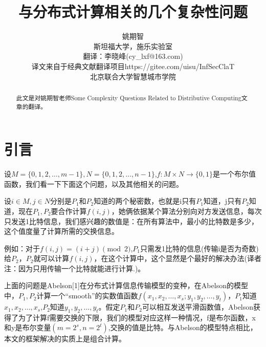 \documentclass[]{article}
\title{与分布式计算相关的几个复杂性问题}
\author{姚期智\\
	斯坦福大学，施乐实验室\\
{\small  翻译：李晓峰(cy\_lxf@163.com)}\\
{\small  译文来自于经典文献翻译项目https://gitee.com/uisu/InfSecClaT}\\
{\small 北京联合大学智慧城市学院}
}
\begin{document}
	
	\maketitle
	
	\begin{abstract}
		此文是对姚期智老师Some Complexity Questions Related to Distributive Computing文章的翻译。
	\end{abstract}
	
	\section{引言}
	设$M=\{0,1,2,\ldots,m-1\},N=\{0,1,2,\dots,n-1\}$,$f:M\times N \rightarrow \{0,1\}$是一个布尔值函数，我们看一下下面这个问题，以及其他相关的问题。\par
	设$i\in M,j\in N$分别是$P_1$和$P_2$知道的两个秘密数，也就是i只有$P_1$知道，j只有$P_2$知道，现在$P_1,P_2$要合作计算$f(i,j)$，她俩依据某个算法分别向对方发送信息，每次只发送1比特信息，我们感兴趣的数值是：在所有算法中，最小的比特数是多少，这个值度量了计算所需的交换信息。\par
	例如：对于$f(i,j)=(i+j)\pmod{2}$,$P_1$只需发1比特的信息(传输i是否为奇数)给$P_2$，$P_2$就可以计算$f(i,j)$，在这个计算中，这个显然是个最好的解决办法(译者注：因为只用传输一个比特就能进行计算.)。\par
	上面的问题是Abelson[1]在分布式计算信息传输模型的变种，在Abelson的模型中，$P_1,P_2$计算一个“smooth”的实数值函数$f(x_1,x_2,\ldots,x_s;y_1,y_2,\ldots,y_t)$，$P_1$知道$x_1,x_2,\ldots,x_s$,$P_2$知道$y_1,y_2,\ldots,y_t$。假定$P_1$和$P_2$可以相互发送平滑函数值，Abelson获得了为了计算f需要交换的下限，我们的模型对应这样一种情况，f是布尔函数，x和y是布尔变量$(m=2^s,n=2^t)$,交换的值是比特。与Abelson的模型特点相比，本文的框架解决的实质上是组合计算。
	
\end{document}
